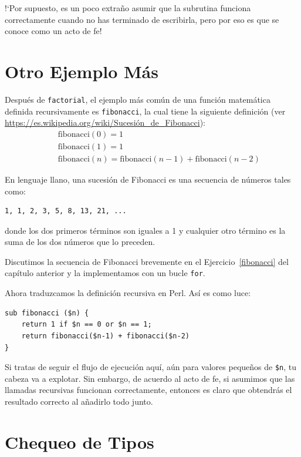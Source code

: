 !`Por supuesto, es un poco extraño asumir que la subrutina funciona correctamente
cuando no has terminado de escribirla, pero por eso es que se conoce 
como un acto de fe!


\section{Otro Ejemplo Más}
\label{one.more.example}

Después de {\tt factorial}, el ejemplo más común de una función
matemática definida recursivamente es {\tt fibonacci}, la cual tiene
la siguiente definición (ver
  \url{https://es.wikipedia.org/wiki/Sucesión_de_Fibonacci}):
%
\begin{eqnarray*}
&& \mathrm{fibonacci}(0) = 1 \\
&& \mathrm{fibonacci}(1) = 1 \\
&& \mathrm{fibonacci}(n) = \mathrm{fibonacci}(n-1) + \mathrm{fibonacci}(n-2)
\end{eqnarray*}
%

En lenguaje llano, una sucesión de Fibonacci es una secuencia de
números tales como:
\begin{lstlisting}
1, 1, 2, 3, 5, 8, 13, 21, ...
\end{lstlisting}
donde los dos primeros términos son iguales a 1 y cualquier otro
término es la suma de los dos números que lo preceden.

Discutimos la secuencia de Fibonacci brevemente en el Ejercicio~\ref{fibonacci}
del capítulo anterior y la implementamos con un bucle {\tt for}.

Ahora traduzcamos la definición recursiva en Perl. Así es como luce:

\begin{lstlisting}
sub fibonacci ($n) {
    return 1 if $n == 0 or $n == 1;
    return fibonacci($n-1) + fibonacci($n-2)
}
\end{lstlisting}
%
Si tratas de seguir el flujo de ejecución aquí, aún para valores
pequeños de \verb|$n|, tu cabeza va a explotar. Sin embargo, de acuerdo
al acto de fe, si asumimos que las llamadas recursivas funcionan correctamente,
entonces es claro que obtendrás el resultado correcto al añadirlo todo 
junto.


\section{Chequeo de Tipos}
\label{guardian}

